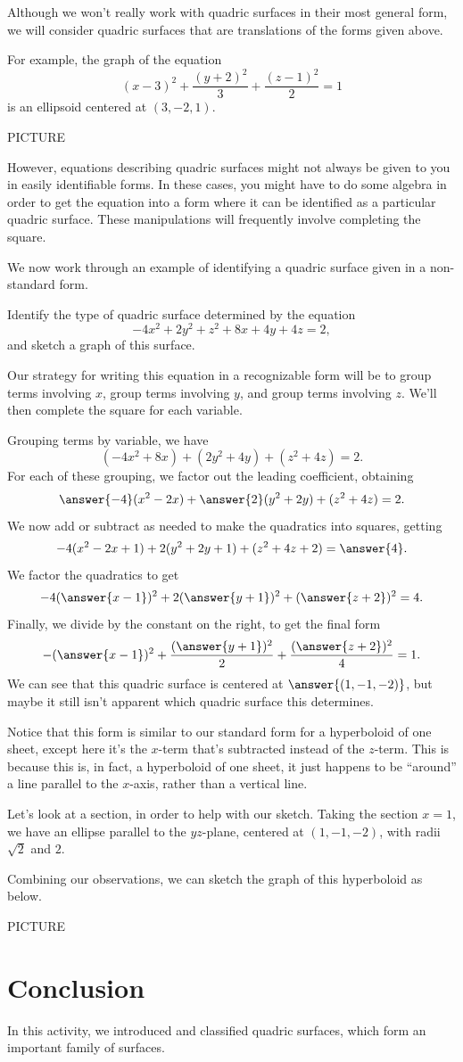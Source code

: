 \documentclass{ximera}
\begin{document}
Although we won't really work with quadric surfaces in their most general form, we will consider quadric surfaces that are translations of the forms given above.

For example, the graph of the equation
\[
(x-3)^2 + \frac{(y+2)^2}{3} + \frac{(z-1)^2}{2} = 1
\]
is an ellipsoid centered at $(3,-2,1)$.

PICTURE

However, equations describing quadric surfaces might not always be given to you in easily identifiable forms. In these cases, you might have to do some algebra in order to get the equation into a form where it can be identified as a particular quadric surface. These manipulations will frequently involve completing the square.

We now work through an example of identifying a quadric surface given in a non-standard form.

\begin{example}
Identify the type of quadric surface determined by the equation
\[
-4x^2 + 2y^2 + z^2 + 8x + 4y+4z = 2,
\]
and sketch a graph of this surface.

Our strategy for writing this equation in a recognizable form will be to group terms involving $x$, group terms involving $y$, and group terms involving $z$. We'll then complete the square for each variable.

Grouping terms by variable, we have
\[
(-4x^2+8x) + (2y^2 + 4y) + (z^2 + 4z) = 2.
\]
For each of these grouping, we factor out the leading coefficient, obtaining
\[
\answer{-4}(x^2-2x) + \answer{2}(y^2 + 2y) + (z^2 + 4z) = 2.
\]
We now add or subtract as needed to make the quadratics into squares, getting
\[
-4(x^2-2x + 1) + 2(y^2 + 2y + 1) + (z^2 + 4z + 2) = \answer{4}.
\]
We factor the quadratics to get
\[
-4(\answer{x-1})^2 + 2(\answer{y+1})^2 + (\answer{z+2})^2 = 4.
\]
Finally, we divide by the constant on the right, to get the final form
\[
-(\answer{x-1})^2 + \frac{(\answer{y+1})^2}{2} + \frac{(\answer{z+2})^2}{4} = 1.
\]
We can see that this quadric surface is centered at $\answer{(1,-1,-2)}$, but maybe it still isn't apparent which quadric surface this determines.

Notice that this form is similar to our standard form for a hyperboloid of one sheet, except here it's the $x$-term that's subtracted instead of the $z$-term. This is because this is, in fact, a hyperboloid of one sheet, it just happens to be ``around'' a line parallel to the $x$-axis, rather than a vertical line.

Let's look at a section, in order to help with our sketch. Taking the section $x = 1$, we have an ellipse parallel to the $yz$-plane, centered at $(1,-1,-2)$, with radii $\sqrt{2}$ and $2$.

Combining our observations, we can sketch the graph of this hyperboloid as below.

PICTURE
\end{example}

\section*{Conclusion}

In this activity, we introduced and classified quadric surfaces, which form an important family of surfaces.
\end{document}
